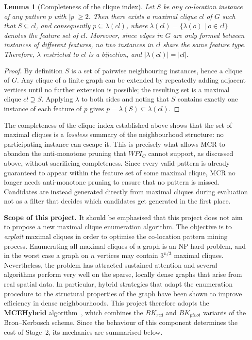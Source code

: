 \documentclass[12pt, letterpaper]{template}
\newtheorem{lemma}{Lemma}
\theoremstyle{definition}
\begin{document}
\begin{lemma}[Completeness of the clique index]
\label{lem:completeness}
Let $S$ be any co-location
instance of any pattern $p$ with $|p| \ge 2$. Then there exists a maximal
clique $cl$ of $G$ such that $S \subseteq cl$, and consequently
$p \subseteq \lambda(cl)$, where $\lambda(cl) = \{\lambda(o) \mid o \in cl\}$
denotes the feature set of $cl$. Moreover, since edges in $G$ are only
formed between instances of different features, no two instances in $cl$
share the same feature type. Therefore, $\lambda$ restricted to $cl$ is a
bijection, and $|\lambda(cl)| = |cl|$.
\end{lemma}

\begin{proof}
\renewcommand{\qedsymbol}{}
By definition $S$ is a set of pairwise neighbouring instances, hence a clique of $G$. Any
clique of a finite graph can be extended by repeatedly adding adjacent vertices until no
further extension is possible; the resulting set is a maximal clique $cl \supseteq S$.
Applying $\lambda$ to both sides and noting that $S$ contains exactly one instance of each
feature of $p$ gives $p = \lambda(S) \subseteq \lambda(cl)$.
\end{proof}

The completeness of the clique index established above shows that the set
of maximal cliques is a \emph{lossless} summary of the neighbourhood
structure: no participating instance can escape it. This is precisely what allows MCR to abandon the anti-monotone pruning that $WPI_C$ cannot support, as discussed above, without sacrificing
completeness. Since every valid pattern is already guaranteed to appear
within the feature set of some maximal clique, MCR no longer needs
anti-monotone pruning to ensure that no pattern is missed. Candidates are
instead generated directly from maximal cliques during evaluation not as a filter that decides which candidates get generated in the first place.

\noindent\textbf{Scope of this project.}
It should be emphasised that this project does not aim to propose a new maximal clique
enumeration algorithm. The objective is to \emph{exploit} maximal cliques in order to
optimise the co-location pattern mining process. Enumerating all maximal cliques of a graph is an
NP-hard problem, and in the worst case a graph on $n$ vertices may contain $3^{n/3}$ maximal
cliques. Nevertheless, the problem has attracted sustained attention and several algorithms
perform very well on the sparse, locally dense graphs that arise from real spatial data. In
particular, hybrid strategies that adapt the enumeration procedure to the structural
properties of the graph have been shown to improve efficiency in dense neighbourhoods.
This project therefore adopts the \textbf{MCEHybrid} algorithm~\cite{li2019fast}, which
combines the $BK_{rcd}$ and $BK_{pivot}$ variants of the Bron--Kerbosch scheme. Since the
behaviour of this component determines the cost of Stage~2, its mechanics are summarised
below.
\end{document}
